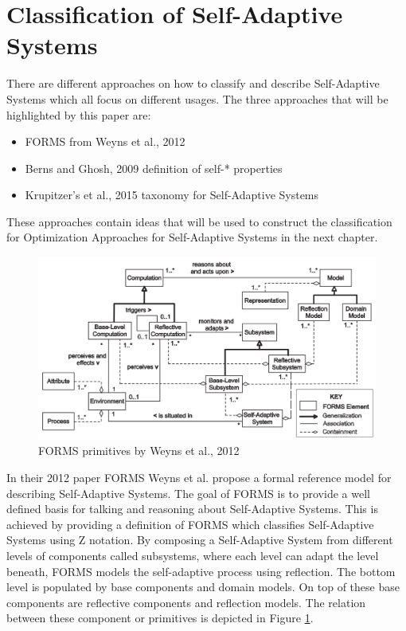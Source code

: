 \newpage
\section{Classification of Self-Adaptive Systems}
\label{ch:SASClassification}

There are different approaches on how to classify and describe Self-Adaptive Systems which all focus on different usages.
The three approaches that will be highlighted by this paper are:
\begin{itemize}
    \item FORMS from Weyns et al., 2012 \cite*{FORMS}
    \item Berns and Ghosh, 2009 definition of self-* properties \cite*{DissectingSelfProperties}
    \item Krupitzer's et al., 2015 taxonomy for Self-Adaptive Systems \cite*{SurveyOnEngineeringApproaches}
\end{itemize} 
These approaches contain ideas that will be used to construct the classification for
Optimization Approaches for Self-Adaptive Systems in the next chapter.
\newline
\par

\begin{figure}[b!]
    \centering
    \includegraphics[width=\textwidth]{images/FORMS.png}
    \caption{FORMS primitives by Weyns et al., 2012 \cite*{FORMS}}
    \label{fig:FORMS}
\end{figure}
In their 2012 paper FORMS \cite{FORMS} Weyns et al. propose a formal reference model for describing Self-Adaptive Systems.
The goal of FORMS is to provide a well defined basis for talking and reasoning about Self-Adaptive Systems.
This is achieved by providing a definition of FORMS which classifies Self-Adaptive Systems using Z notation.
By composing a Self-Adaptive System from different levels of components called subsystems,
where each level can adapt the level beneath, FORMS models the self-adaptive process using reflection.
The bottom level is populated by base components and domain models.
On top of these base components are reflective components and reflection models.
The relation between these component or primitives is depicted in Figure \ref{fig:FORMS}.
\newline
\par


